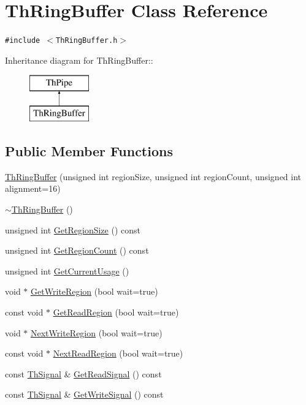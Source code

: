 \hypertarget{class_th_ring_buffer}{
\section{ThRingBuffer Class Reference}
\label{class_th_ring_buffer}
}
{\tt \#include $<$ThRingBuffer.h$>$}

Inheritance diagram for ThRingBuffer::\begin{figure}[H]
\begin{center}
\leavevmode
\includegraphics[height=2cm]{class_th_ring_buffer}
\end{center}
\end{figure}
\subsection*{Public Member Functions}
\begin{CompactItemize}
\item 
\hyperlink{class_th_ring_buffer_0405ced6ef8ae7a75afd6f67688e47f3}{ThRingBuffer} (unsigned int regionSize, unsigned int regionCount, unsigned int alignment=16)
\item 
\hyperlink{class_th_ring_buffer_7a37bd1afc7b71c502cbea7e1b5004f3}{$\sim$ThRingBuffer} ()
\item 
unsigned int \hyperlink{class_th_ring_buffer_15dac6f34adbef384a16fa2f184eb372}{GetRegionSize} () const 
\item 
unsigned int \hyperlink{class_th_ring_buffer_9cb0a2b4b02c3c02fdb0f30386e80ef4}{GetRegionCount} () const 
\item 
unsigned int \hyperlink{class_th_ring_buffer_d2e1aa38203a30491e3eb2ec7eafcc4c}{GetCurrentUsage} ()
\item 
void $\ast$ \hyperlink{class_th_ring_buffer_6a921c362dd2cfe8173f065c884f34ac}{GetWriteRegion} (bool wait=true)
\item 
const void $\ast$ \hyperlink{class_th_ring_buffer_9a183e067d41605a1c376a84f4dbf4b2}{GetReadRegion} (bool wait=true)
\item 
void $\ast$ \hyperlink{class_th_ring_buffer_9a74853f2ccbc0d1b441efec8bb553d3}{NextWriteRegion} (bool wait=true)
\item 
const void $\ast$ \hyperlink{class_th_ring_buffer_fb5a911ce0ebb981ce95557101b84a83}{NextReadRegion} (bool wait=true)
\item 
const \hyperlink{class_th_signal}{ThSignal} \& \hyperlink{class_th_ring_buffer_97f956255ad5d7b0dad71096e7c79423}{GetReadSignal} () const 
\item 
const \hyperlink{class_th_signal}{ThSignal} \& \hyperlink{class_th_ring_buffer_bc8836a944eb477e1f3e7b505d589ac9}{GetWriteSignal} () const 
\end{CompactItemize}


